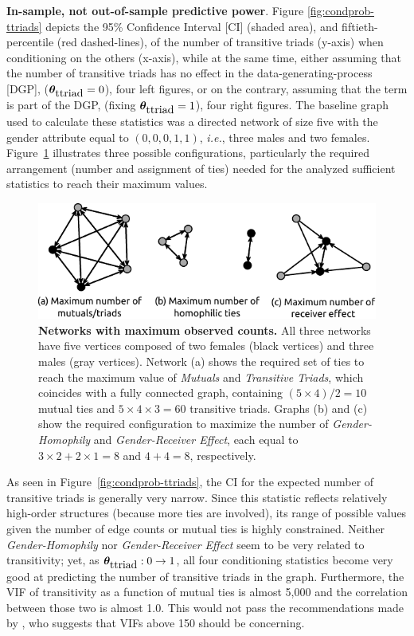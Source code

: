 \documentclass[12pt]{article}
\begin{document}
\noindent \textbf{In-sample, not out-of-sample predictive power}. Figure \ref{fig:condprob-ttriads} depicts the 95\% Confidence Interval [CI] (shaded area), and fiftieth-percentile (red dashed-lines), of the number of transitive triads (y-axis) when conditioning on the others (x-axis), while at the same time, either assuming that the number of transitive triads has no effect in the data-generating-process [DGP], ($\bm{\theta}_{\mbox{ttriad}} = 0$), four left figures, or on the contrary, assuming that the term is part of the DGP, (fixing $\bm{\theta}_{\mbox{ttriad}}= 1$), four right figures. The baseline graph used to calculate these statistics was a directed network of size five with the gender attribute equal to $(0,0,0,1,1)$, \textit{i.e.}, three males and two females. Figure~\ref{fig:maxout-gof} illustrates three possible configurations, particularly the required arrangement (number and assignment of ties) needed for the analyzed sufficient statistics to reach their maximum values.

\begin{figure}[]
    \centering
    \includegraphics[width = .7\linewidth]{figures/max-out-stats.pdf}
    \caption[Examples of Networks with the maximum observed counts]{\textbf{Networks with maximum observed counts.} All three networks have five vertices composed of two females (black vertices) and three males (gray vertices).
    Network (a) shows the required set of ties to reach the maximum value of \textit{Mutuals} and \textit{Transitive Triads}, which coincides with a fully connected graph, containing $(5\times 4)/2 = 10$ mutual ties and $5 \times 4 \times 3 = 60$ transitive triads.
    Graphs (b) and (c) show the required configuration to maximize the number of \textit{Gender-Homophily} and \textit{Gender-Receiver Effect}, each equal to $3\times 2 + 2\times 1 = 8$ and $4 + 4 = 8$, respectively.}
    \label{fig:maxout-gof}
\end{figure}

As seen in Figure~\ref{fig:condprob-ttriads}, the CI for the expected number of transitive triads is generally very narrow. Since this statistic reflects relatively high-order structures (because more ties are involved), its range of possible values given the number of edge counts or mutual ties is highly constrained. Neither \textit{Gender-Homophily} nor \textit{Gender-Receiver Effect} seem to be very related to transitivity; yet, as $\bm{\theta}_{\mbox{ttriad}}: 0\to 1$, all four conditioning statistics become very good at predicting the number of transitive triads in the graph. Furthermore, the VIF of transitivity as a function of mutual ties is almost 5,000 and the correlation between those two is almost 1.0. This would not pass the recommendations made by \citeauthor*{duxburyDiagnosingMulticollinearityExponential2021}, who suggests that VIFs above 150 should be concerning.
\end{document}
